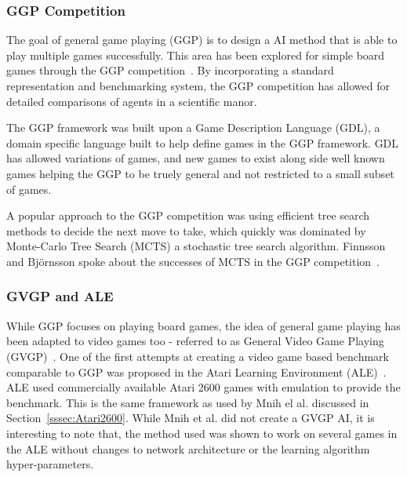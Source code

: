 \subsubsection{GGP Competition}
The goal of general game playing (GGP) is to design a AI method that is able to play multiple games successfully.
This area has been explored for simple board games through the GGP competition~\cite{GGP}.
By incorporating a standard representation and benchmarking system, the GGP competition has allowed for detailed comparisons of agents in a scientific manor.
\par
The GGP framework was built upon a Game Description Language (GDL), a domain specific language built to help define games in the GGP framework.
GDL has allowed variations of games, and new games to exist along side well known games helping the GGP to be truely general and not restricted to a small subset of games.
\par
A popular approach to the GGP competition was using efficient tree search methods to decide the next move to take, which quickly was dominated by Monte-Carlo Tree Search (MCTS) a stochastic tree search algorithm.
Finnsson and Bj{\"o}rnsson spoke about the successes of MCTS in the GGP competition~\cite{MCTSGGP}.

\subsubsection{GVGP and ALE}
While GGP focuses on playing board games, the idea of general game playing has been adapted to video games too - referred to as General Video Game Playing (GVGP)~\cite{GVGP}.
One of the first attempts at creating a video game based benchmark comparable to GGP was proposed in the Atari Learning Environment (ALE)~\cite{ALE}.
ALE used commercially available Atari 2600 games with emulation to provide the benchmark.
This is the same framework as used by Mnih el al. discussed in Section~\ref{sssec:Atari2600}.
While Mnih et al. did not create a GVGP AI, it is interesting to note that, the method used was shown to work on several games in the ALE without changes to network architecture or the learning algorithm hyper-parameters.

